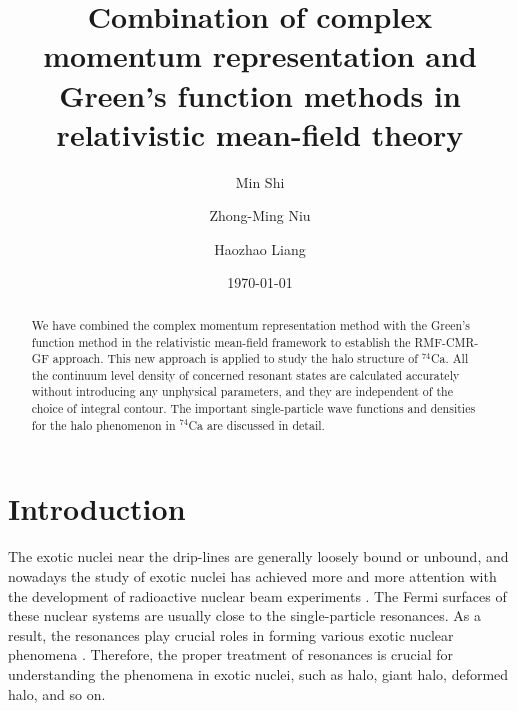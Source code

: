 \documentclass[twocolumn,prc,preprintnumbers,superscriptaddress,floatfix,showpacs]{revtex4}
\begin{document}
\title{Combination of complex momentum representation and Green's function methods in relativistic mean-field theory}

\author{Min Shi}

\author{Zhong-Ming Niu}

\author{Haozhao Liang}

\date{\today }

\begin{abstract}
We have combined the complex momentum representation method with the Green's function method in the relativistic mean-field framework to establish the RMF-CMR-GF approach. This new approach is applied to study the halo structure of $^{74}$Ca. All the continuum level density of concerned resonant states are calculated accurately without introducing any unphysical parameters, and they are independent of the choice of integral contour. The important single-particle wave functions and densities for the halo phenomenon in $^{74}$Ca are discussed in detail.
\end{abstract}



\maketitle

\section{Introduction}

The exotic nuclei near the drip-lines are generally loosely bound or unbound, and nowadays the study of exotic nuclei has achieved more and more attention with the development of radioactive nuclear beam experiments \cite{Tanihata1996}. The Fermi surfaces of these nuclear systems are usually close to the single-particle resonances. As a result, the resonances play crucial roles in forming various exotic nuclear phenomena \cite{Dobaczewski1996, Poschl1997, Meng1996, Zhang2012, Zhou2010, Jensen2004, Meng2006, Meng2015}. Therefore, the proper treatment of resonances is crucial for understanding the phenomena in exotic nuclei, such as halo, giant halo, deformed halo, and so on.
\end{document}
